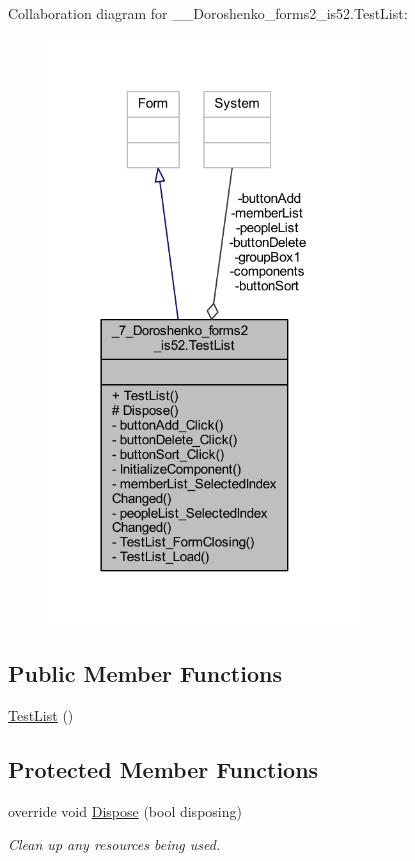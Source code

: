 Collaboration diagram for \+\_\+\_\+\+Doroshenko\+\_\+forms2\+\_\+is52.\+Test\+List\+:
\nopagebreak
\begin{figure}[H]
\begin{center}
\leavevmode
\includegraphics[width=234pt]{class__7___doroshenko__forms2__is52_1_1_test_list__coll__graph}
\end{center}
\end{figure}
\subsection*{Public Member Functions}
\begin{DoxyCompactItemize}
\item 
\hyperlink{class__7___doroshenko__forms2__is52_1_1_test_list_a5190182621fe4b4acb79b2dfabf0a236}{Test\+List} ()
\end{DoxyCompactItemize}
\subsection*{Protected Member Functions}
\begin{DoxyCompactItemize}
\item 
override void \hyperlink{class__7___doroshenko__forms2__is52_1_1_test_list_ad8578919a81e70434bb1a87d4def4071}{Dispose} (bool disposing)
\begin{DoxyCompactList}\small\item\em Clean up any resources being used. \end{DoxyCompactList}\end{DoxyCompactItemize}
